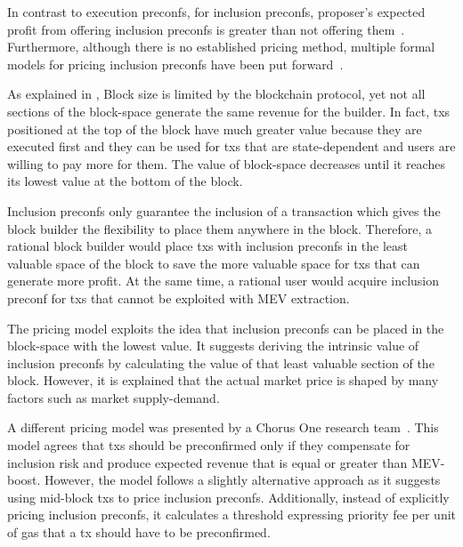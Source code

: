 \documentclass[conference]{IEEEtran}
\theoremstyle{boldstyle}
\begin{document}
    In contrast to execution preconfs, for inclusion preconfs, proposer's expected profit from offering inclusion preconfs is greater than not offering them~\cite{W:AnalysingExpectedProposerRevenuefromPreconfirmations}. Furthermore, although there is no established pricing method, multiple formal models for pricing inclusion preconfs have been put forward~\cite{W:APricingModelforInclusionPreconfirmations,W:PricingTransactionsforPreconfirmation}.

    As explained in \cite{W:APricingModelforInclusionPreconfirmations}, Block size is limited by the blockchain protocol, yet not all sections of the block-space generate the same revenue for the builder. In fact, txs positioned at the top of the block have much greater value because they are executed first and they can be used for txs that are state-dependent and users are willing to pay more for them. The value of block-space decreases until it reaches its lowest value at the bottom of the block.
    
    Inclusion preconfs only guarantee the inclusion of a transaction which gives the block builder the flexibility to place them anywhere in the block. Therefore, a rational block builder would place txs with inclusion preconfs in the least valuable space of the block to save the more valuable space for txs that can generate more profit. At the same time, a rational user would acquire inclusion preconf for txs that cannot be exploited with MEV extraction.

    The pricing model exploits the idea that inclusion preconfs can be placed in the block-space with the lowest value. It suggests deriving the intrinsic value of inclusion preconfs by calculating the value of that least valuable section of the block. However, it is explained that the actual market price is shaped by many factors such as market supply-demand.

    A different pricing model was presented by a Chorus One research team~\cite{W:PricingTransactionsforPreconfirmation}. This model agrees that txs should be preconfirmed only if they compensate for inclusion risk and produce expected revenue that is equal or greater than MEV-boost. However, the model follows a slightly alternative approach as it suggests using mid-block txs to price inclusion preconfs. Additionally, instead of explicitly pricing inclusion preconfs, it calculates a threshold expressing priority fee per unit of gas that a tx should have to be preconfirmed.
\end{document}
